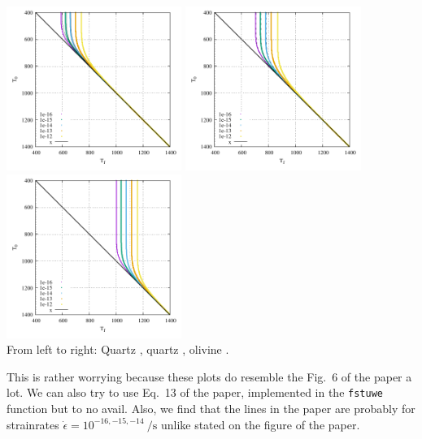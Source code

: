 \begin{center}
\includegraphics[width=5.7cm]{python_codes/fieldstone_167/1zero/fig6.pdf}
\includegraphics[width=5.7cm]{python_codes/fieldstone_167/2zero/fig6.pdf}
\includegraphics[width=5.7cm]{python_codes/fieldstone_167/3zero/fig6.pdf}\\
{\captionfont From left to right: Quartz \cite{brko80}, quartz \cite{stsa94}, olivine \cite{brko80}.}
\end{center}

This is rather worrying because these plots do resemble the Fig.~6 of the paper a lot.
We can also try to use Eq.~13 of the paper, implemented in the \lstinline|fstuwe|
function but to no avail.
Also, we find that the lines in the paper are probably for strainrates 
$\dot{\epsilon}=10^{-16,-15,-14}~\si{\per\second}$ unlike stated on the figure of the paper.








